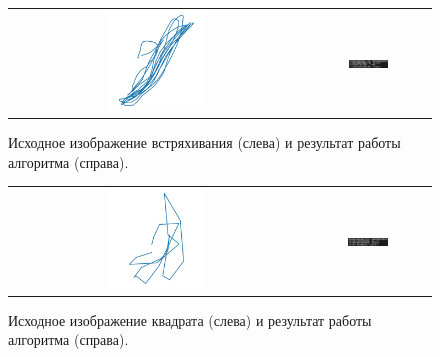 \begin{figure}[H]
    \begin{center}
        \begin{tabular}{cc}
            \includegraphics[width=0.35\textwidth]{max_kt2_images/image9.jpg} & 
            \includegraphics[width=0.35\textwidth]{max_kt2_images/image8.png} \\
        \end{tabular}
    \end{center}
    \caption{Исходное изображение встряхивания (слева) и результат работы алгоритма (справа).}
\end{figure}

\begin{figure}[H]
    \begin{center}
        \begin{tabular}{cc}
            \includegraphics[width=0.35\textwidth]{max_kt2_images/image3.jpg} & 
            \includegraphics[width=0.35\textwidth]{max_kt2_images/image1.png} \\
        \end{tabular}
    \end{center}
    \caption{Исходное изображение квадрата (слева) и результат работы алгоритма (справа).}
\end{figure}

